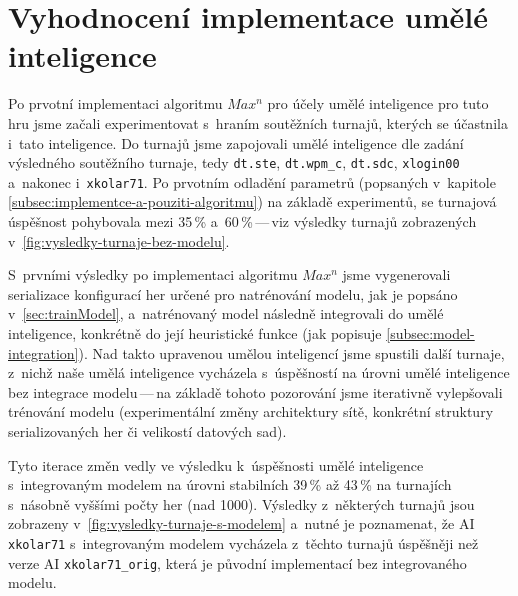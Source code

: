 \documentclass[11pt, a4paper]{article}
\theoremstyle{definition}
\begin{document}
\section{Vyhodnocení implementace umělé inteligence}
\label{sec:eval}

Po prvotní implementaci algoritmu $ Max^n $ pro účely umělé inteligence pro tuto hru jsme začali experimentovat s~hraním soutěžních turnajů, kterých se účastnila i~tato inteligence. Do turnajů jsme zapojovali umělé inteligence dle zadání výsledného soutěžního turnaje, tedy \texttt{dt.ste},  \texttt{dt.wpm\_c}, \texttt{dt.sdc}, \texttt{xlogin00} a~nakonec i~\texttt{xkolar71}. Po prvotním odladění parametrů (popsaných v~kapitole \ref{subsec:implementce-a-pouziti-algoritmu}) na základě experimentů,
se turnajová úspěšnost pohybovala mezi 35\,\% a~60\,\%\,---\,viz výsledky turnajů zobrazených v~\ref{fig:vysledky-turnaje-bez-modelu}.

S~prvními výsledky po implementaci algoritmu $ Max^n $ jsme vygenerovali serializace konfigurací her určené pro natrénování modelu, jak je popsáno v~\ref{sec:trainModel}, a~natrénovaný model následně integrovali do umělé inteligence, konkrétně do její heuristické funkce (jak popisuje \ref{subsec:model-integration}). Nad takto upravenou umělou inteligencí jsme spustili další turnaje, z~nichž naše umělá inteligence vycházela s~úspěšností na úrovni umělé inteligence bez integrace modelu\,---\,na základě tohoto pozorování jsme iterativně vylepšovali trénování modelu (experimentální změny architektury sítě, konkrétní struktury serializovaných her či velikostí datových sad).

Tyto iterace změn vedly ve výsledku k~úspěšnosti umělé inteligence s~integrovaným modelem na úrovni stabilních 39\,\% až 43\,\% na turnajích s~násobně vyššími počty her (nad 1000). Výsledky z~některých turnajů jsou zobrazeny v~\ref{fig:vysledky-turnaje-s-modelem} a~nutné je poznamenat, že AI \texttt{xkolar71} s~integrovaným modelem vycházela z~těchto turnajů úspěšněji než verze AI \texttt{xkolar71\_orig}, která je původní implementací bez integrovaného modelu.
\end{document}
